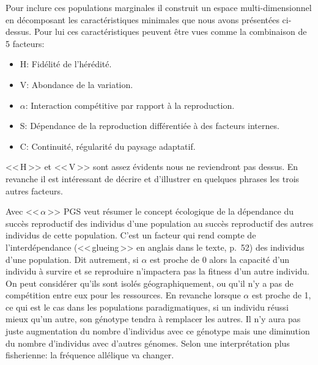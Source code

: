 Pour inclure ces populations marginales il construit un espace multi-dimensionnel en décomposant les caractéristiques minimales que nous avons présentées ci-dessus. Pour lui ces caractéristiques peuvent être vues comme la combinaison de 5 facteurs:  
\begin{itemize}
	\item H: Fidélité de l'hérédité.
	\item V: Abondance de la variation.
	\item $\alpha$: Interaction compétitive par rapport à la reproduction.
	\item S: Dépendance de la reproduction différentiée à des facteurs internes.
	\item C: Continuité, régularité du paysage adaptatif.
\end{itemize}


<<\,H\,>> et <<\,V\,>> sont assez évidents nous ne reviendront pas dessus. En revanche il est intéressant de décrire et d'illustrer en quelques phrases les trois autres facteurs.

Avec <<\,$\alpha$\,>> PGS veut résumer le concept écologique de la dépendance du succès reproductif des individus d'une population au succès reproductif des autres individus de cette population. C'est un facteur qui rend compte de l'interdépendance (<<\,glueing\,>> en anglais dans le texte, p.~52)  des individus d'une population. Dit autrement, si $\alpha$ est proche de 0 alors la capacité d'un individu à survire et se reproduire n'impactera pas la fitness d'un autre individu. On peut considérer qu'ils sont isolés géographiquement, ou qu'il n'y a pas de compétition entre eux pour les ressources. En revanche lorsque $\alpha$ est proche de 1, ce qui est le cas dans les populations paradigmatiques, si un individu réussi mieux qu'un autre, son génotype tendra à remplacer les autres. Il n'y aura pas juste augmentation du nombre d'individus avec ce génotype mais une diminution du nombre d'individus avec d'autres génomes. Selon une interprétation plus fisherienne: la fréquence allélique va changer.

